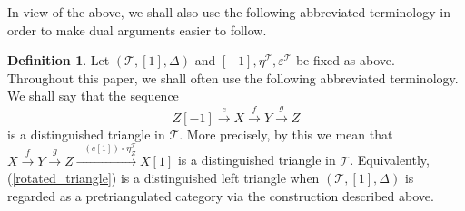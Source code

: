 \documentclass[a4paper,reqno,10pt]{amsart}
\theoremstyle{definition}
\newtheorem{definition}[definition]{Definition}
\theoremstyle{definition}
\theoremstyle{definition}
\theoremstyle{definition}
\theoremstyle{plain}
\newcommand{\CT}{\mathcal{T}}
\begin{document}
In view of the above, we shall also use the following abbreviated terminology in order to make dual arguments easier to follow.

\begin{definition}
Let $(\CT,[1],\Delta)$ and $[-1],\eta^{\CT},\varepsilon^{\CT}$ be fixed as above.
Throughout this paper, we shall often use the following abbreviated terminology. We shall say that the sequence
\begin{equation}\label{rotated_triangle}
Z[-1]\xrightarrow{e}X\xrightarrow{f}Y\xrightarrow{g}Z
\end{equation}
is a distinguished triangle in $\CT$. More precisely, by this we mean that
$X\xrightarrow{f}Y\xrightarrow{g}Z
\xrightarrow{-(e[1])\circ\eta^{\CT}_Z}
X[1]$
is a distinguished triangle in $\CT$.
Equivalently, (\ref{rotated_triangle}) is a distinguished left triangle when $(\CT,[1],\Delta)$ is regarded as a pretriangulated category via the construction described above.
\end{definition}
\end{document}
